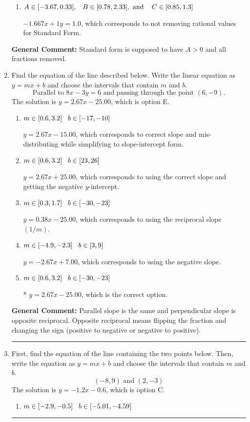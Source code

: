 \documentclass{extbook}[14pt]
\newcommand{\litem}[1]{\item #1

\rule{\textwidth}{0.4pt}}
\begin{document}
\begin{enumerate}
{\begin{enumerate}[label=\Alph*.]
 $-1.667x - 1y = -1.0$, which corresponds to using the opposite (negative) slope of the graph and not removing rational values.
\item \( A \in [-3.67, 0.33], \hspace{3mm} B \in [0.78, 2.33], \text{ and } \hspace{3mm} C \in [0.85, 1.3] \)

 $-1.667x + 1y = 1.0$, which corresponds to not removing rational values for Standard Form.
\end{enumerate}

\textbf{General Comment:} Standard form is supposed to have $A > 0$ and all fractions removed.
}
\litem{
Find the equation of the line described below. Write the linear equation as $ y=mx+b $ and choose the intervals that contain $m$ and $b$.
\[ \text{Parallel to } 8 x - 3 y = 6 \text{ and passing through the point } (6, -9). \]The solution is \( y = 2.67x - 25.00 \), which is option E.\begin{enumerate}[label=\Alph*.]
\item \( m \in [0.6, 3.2] \hspace*{3mm} b \in [-17, -10] \)

 $y = 2.67x - 15.00$, which corresponds to correct slope and mis-distributing while simplifying to slope-intercept form.
\item \( m \in [0.6, 3.2] \hspace*{3mm} b \in [23, 26] \)

 $y = 2.67x + 25.00$, which corresponds to using the correct slope and getting the negative $y$-intercept.
\item \( m \in [0.3, 1.7] \hspace*{3mm} b \in [-30, -23] \)

 $y = 0.38x - 25.00$, which corresponds to using the reciprocal slope $(1/m)$.
\item \( m \in [-4.9, -2.3] \hspace*{3mm} b \in [3, 9] \)

 $y = -2.67x + 7.00$, which corresponds to using the negative slope.
\item \( m \in [0.6, 3.2] \hspace*{3mm} b \in [-30, -23] \)

* $y = 2.67x - 25.00$, which is the correct option.
\end{enumerate}

\textbf{General Comment:} Parallel slope is the same and perpendicular slope is opposite reciprocal. Opposite reciprocal means flipping the fraction and changing the sign (positive to negative or negative to positive).
}
\litem{
First, find the equation of the line containing the two points below. Then, write the equation as $ y=mx+b $ and choose the intervals that contain $m$ and $b$.
\[ (-8, 9) \text{ and } (2, -3) \]The solution is \( y = -1.2x -0.6 \), which is option C.\begin{enumerate}[label=\Alph*.]
\item \( m \in [-2.9, -0.5] \hspace*{3mm} b \in [-5.01, -4.59] \)


\end{enumerate}}
\end{enumerate}
\end{document}
